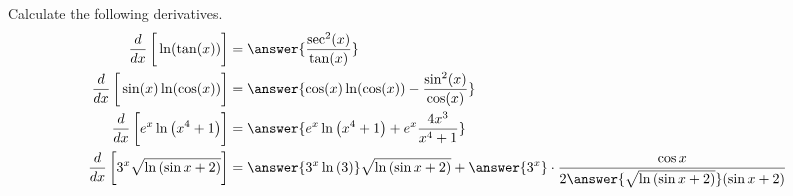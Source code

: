 \documentclass{ximera}
\author{Nela Lakos \and Kyle Parsons}
\begin{document}
\begin{exercise}

Calculate the following derivatives.
\begin{align*}
\frac{d}{dx}\left[\vphantom{\frac{d}{dx}}\ln(\tan(x))\right] &= \answer{\frac{\sec^2(x)}{\tan(x)}}\\
\frac{d}{dx}\left[\vphantom{\frac{d}{dx}}\sin(x)\ln(\cos(x))\right] &= \answer{\cos(x)\ln(\cos(x)) - \frac{\sin^2(x)}{\cos(x)}}\\
\frac{d}{dx}\left[\vphantom{\frac{d}{dx}}e^x\ln\left(x^4+1\right)\right] &= \answer{e^x\ln\left(x^4+1\right) + e^x\frac{4x^3}{x^4+1}}\\
\frac{d}{dx}\left[\vphantom{\frac{d}{dx}}3^x\sqrt{\ln{\left(\sin{x}+2\right)}}\right] &= \answer{3^{x}\ln{(3)}}\sqrt{\ln{\left(\sin{x}+2\right)}}+\answer{3^{x}}\cdot\dfrac{\cos{x}}{2\answer{\sqrt{\ln{(\sin{x}+2)}}}(\sin{x}+2)}
\end{align*}
\end{exercise}
\end{document}
